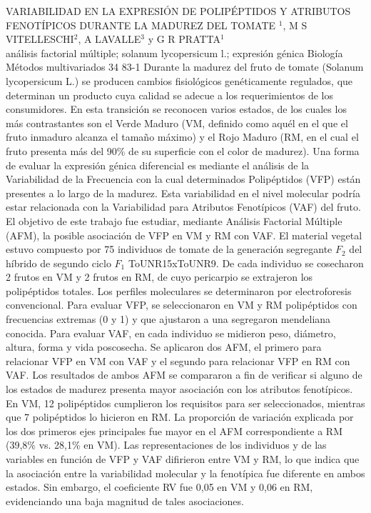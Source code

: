 \A
{VARIABILIDAD EN LA EXPRESIÓN DE POLIPÉPTIDOS Y ATRIBUTOS FENOTÍPICOS DURANTE LA MADUREZ DEL TOMATE}
{$^1$, M S VITELLESCHI$^2$, A LAVALLE$^3$ y G R PRATTA$^1$}
{
\\}
{análisis factorial múltiple; solanum lycopersicum l.; expresión génica} 
 {Biología} 
 {Métodos multivariados} 
 {34} 
 {83-1}
{Durante la madurez del fruto de tomate (Solanum lycopersicum L.) se producen cambios fisiológicos genéticamente regulados, que determinan un producto cuya calidad se adecue a los requerimientos de los consumidores. En esta transición se reconocen varios estados, de los cuales los más contrastantes son el Verde Maduro (VM, definido como aquél en el que el fruto inmaduro alcanza el tamaño máximo) y el Rojo Maduro (RM, en el cual el fruto presenta más del 90\% de su superficie con el color de madurez). Una forma de evaluar la expresión génica diferencial es mediante el análisis de la Variabilidad de la Frecuencia con la cual determinados Polipéptidos (VFP) están presentes a lo largo de la madurez. Esta variabilidad en el nivel molecular podría estar relacionada con la Variabilidad para Atributos Fenotípicos (VAF) del fruto. El objetivo de este trabajo fue estudiar, mediante Análisis Factorial Múltiple (AFM), la posible asociación de VFP en VM y RM con VAF. El material vegetal estuvo compuesto por 75 individuos de tomate de la generación segregante $F_2$ del híbrido de segundo ciclo $F_1$ ToUNR15xToUNR9. De cada individuo se cosecharon 2 frutos en VM y 2 frutos en RM, de cuyo pericarpio se extrajeron los polipéptidos totales. Los perfiles moleculares se determinaron por electroforesis convencional. Para evaluar VFP, se seleccionaron en VM y RM polipéptidos con frecuencias extremas (0 y 1) y que ajustaron a una segregaron mendeliana conocida. Para evaluar VAF, en cada individuo se midieron peso, diámetro, altura, forma y vida poscosecha. Se aplicaron dos AFM, el primero para relacionar VFP en VM con VAF y el segundo para relacionar VFP en RM con VAF. Los resultados de ambos AFM se compararon a fin de verificar si alguno de los estados de madurez presenta mayor asociación con los atributos fenotípicos. En VM, 12 polipéptidos cumplieron los requisitos para ser seleccionados, mientras que 7 polipéptidos lo hicieron en RM. La proporción de variación explicada por los dos primeros ejes principales fue mayor en el AFM correspondiente a RM (39,8\% vs. 28,1\% en VM). Las representaciones de los individuos y de las variables en función de VFP y VAF difirieron entre VM y RM, lo que indica que la asociación entre la variabilidad molecular y la fenotípica fue diferente en ambos estados. Sin embargo, el coeficiente RV fue 0,05 en VM y 0,06 en RM, evidenciando una baja magnitud de tales asociaciones.}
